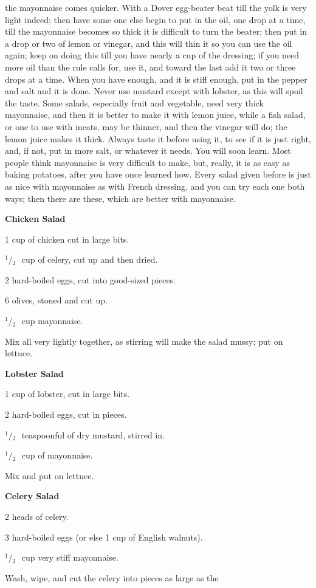 \documentclass[11pt]{book}
\newcommand{\indpar}{\par\noindent\hspace*{\parindent}}
\newcommand{\ingredient}{\indpar}
\newcommand{\instruction}{\indpar}
\newcommand{\OneHalf}{\ensuremath{{}^1\!\!/\!{}_2\mbox{\ }}}
\newenvironment{RecipeTitle}{\medskip\begin{center}\large\bf }{\end{center}\smallskip}
\begin{document}
the mayonnaise comes quicker.  With a Dover egg-beater beat
till the yolk is very light indeed; then have some one else
begin to put in the oil, one drop at a time, till the
mayonnaise becomes so thick it is difficult to turn the
beater; then put in a drop or two of lemon or vinegar,
and this will thin it so you can use the oil again; keep
on doing this till you have nearly a cup of the dressing;
if you need more oil than the rule calls for, use it, and
toward the last add it two or three drops at a time.  When
you have enough, and it is stiff enough, put in the pepper
and salt and it is done.  Never use mustard except with
lobster, as this will spoil the taste.  Some salads,
especially fruit and vegetable, need very thick mayonnaise,
and then it is better to make it with lemon juice, while
a fish salad, or one to use with meats, may be thinner,
and then the vinegar will do; the lemon juice makes it
thick.  Always taste it before using it, to see if it is
just right, and, if not, put in more salt, or whatever
it needs.  You will soon learn.  Most people think
mayonnaise is very difficult to make, but, really, it
is as easy as baking potatoes, after you have once
learned how.  Every salad given before is just as nice
with mayonnaise as with French dressing, and you can try
each one both ways; then there are these, which are better
with mayonnaise.
\begin{RecipeTitle}
Chicken Salad\label{chicken_salad}
\end{RecipeTitle}
\ingredient  1 cup of chicken cut in large bits.
\ingredient  \OneHalf cup of celery, cut up and then dried.
\ingredient  2 hard-boiled eggs, cut into good-sized pieces.
\ingredient  6 olives, stoned and cut up.
\ingredient  \OneHalf cup mayonnaise.
\instruction
  Mix all very lightly together, as stirring will make the
salad mussy; put on lettuce.
\begin{RecipeTitle}
Lobster Salad\label{lobster_salad}
\end{RecipeTitle}
\ingredient  1 cup of lobster, cut in large bits.
\ingredient  2 hard-boiled eggs, cut in pieces.
\ingredient  \OneHalf teaspoonful of dry mustard, stirred in.
\ingredient  \OneHalf cup of mayonnaise.
\instruction
  Mix and put on lettuce.
\begin{RecipeTitle}
Celery Salad\label{celery_salad}
\end{RecipeTitle}
\ingredient  2 heads of celery.
\ingredient  3 hard-boiled eggs (or else
  1 cup of English walnuts).
\ingredient  \OneHalf cup very stiff mayonnaise.
\instruction
  Wash, wipe, and cut the celery into pieces as large as the
\end{document}
